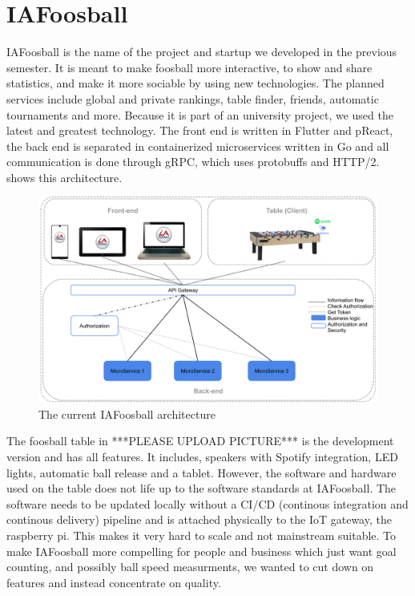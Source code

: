 \section{IAFoosball}
IAFoosball is the name of the project and startup we developed in the previous semester. It is meant to make foosball more interactive, to show and share statistics, and make it more sociable by using new technologies. The planned services include global and private rankings, table finder, friends, automatic tournaments and more. Because it is part of an university project, we used the latest and greatest technology. The front end is written in Flutter and pReact, the back end is separated in containerized microservices written in Go and all communication is done through gRPC, which uses protobuffs and HTTP/2.  shows this architecture.

\begin{figure}[h!]
    \centering
    \includegraphics[scale=0.2]{figures/architecture-old.png}%
    \caption{The current IAFoosball architecture}\label{fig:architectureCurr}
\end{figure}

The foosball table in ***PLEASE UPLOAD PICTURE***%
is the development version and has all features. It includes, speakers with Spotify integration, LED lights, automatic ball release and a tablet. However, the software and hardware used on the table does not life up to the software standards at IAFoosball. The software needs to be updated locally without a CI/CD (continous integration and continous delivery) pipeline and is attached physically to the IoT gateway, the raspberry pi. This makes it very hard to scale and not mainstream suitable. To make IAFoosball more compelling for people and business which just want goal counting, and possibly ball speed measurments, we wanted to cut down on features and instead concentrate on quality.\\


